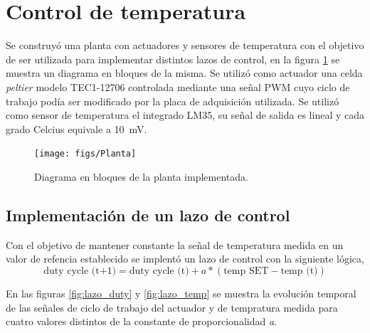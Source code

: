 \documentclass[a4paper,11pt]{article}
\begin{document}
\clearpage
\section{Control de temperatura}
\label{sec:control_temperatura}

Se construyó una planta con actuadores y sensores de temperatura con el
objetivo de ser utilizada para implementar distintos lazos de control,
en la figura \ref{fig:planta} se muestra un diagrama en bloques de la
misma.  Se utilizó como actuador una celda \emph{peltier} modelo
TEC1-12706 controlada mediante una señal PWM cuyo ciclo de trabajo podía
ser modificado por la placa de adquisición utilizada. Se utilizó como
sensor de temperatura el integrado LM35, su señal de salida es lineal y
cada grado Celcius equivale a \SI{10}{\mV}. 

\begin{figure}[!ht]
\centering
\texttt{[image: figs/Planta]}
\caption{Diagrama en bloques de la planta implementada.}
\label{fig:planta}
\end{figure}

\subsection{Implementación de un lazo de control}
Con el objetivo de mantener constante la
señal de temperatura medida en un valor de refencia establecido se
implentó un lazo de control con la siguiente lógica,
\begin{equation*}
\text{duty cycle (t+1)} = \text{duty cycle (t)} + a * (\text{temp SET}
- \text{temp (t)})
\end{equation*}

En las figuras \ref{fig:lazo_duty} y \ref{fig:lazo_temp} se muestra la
evolución temporal de las señales de ciclo de trabajo del actuador y de
tempratura medida para cuatro valores distintos de la constante de
proporcionalidad \emph{a}.
\end{document}

